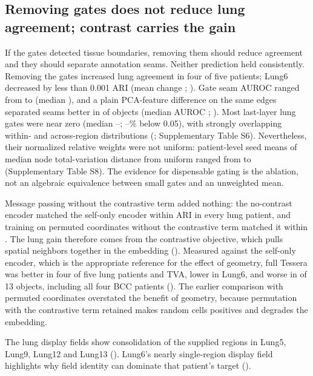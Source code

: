 \subsection{Removing gates does not reduce lung agreement; contrast carries the gain}
If the gates detected tissue boundaries, removing them should reduce agreement and they should separate annotation seams. Neither prediction held consistently. Removing the gates increased lung agreement in four of five patients; Lung6 decreased by less than 0.001 ARI (mean change \NoGateMean{}; ). Gate seam AUROC ranged from \GateAurocMin{} to \GateAurocMax{} (median \GateAurocMedian{}), and a plain PCA-feature difference on the same edges separated seams better in \GateBeaten{} of \GateObjects{} objects (median AUROC \GateExprAurocMedian{}; ). Most last-layer lung gates were near zero (median \LungGateMedianMin{}--\LungGateMedianMax{}; \LungGateLowMin{}--\LungGateLowMax{}\% below 0.05), with strongly overlapping within- and across-region distributions (; Supplementary Table S6). Nevertheless, their normalized relative weights were not uniform: patient-level seed means of median node total-variation distance from uniform ranged from \LungWeightTvdMin{} to \LungWeightTvdMax{} (Supplementary Table S8). The evidence for dispensable gating is the ablation, not an algebraic equivalence between small gates and an unweighted mean.

Message passing without the contrastive term added nothing: the no-contrast encoder matched the self-only encoder within \NoContrastSelfMaxGap{} ARI in every lung patient, and training on permuted coordinates without the contrastive term matched it within \PermNoContrastMaxGap{}. The lung gain therefore comes from the contrastive objective, which pulls spatial neighbors together in the embedding (). Measured against the self-only encoder, which is the appropriate reference for the effect of geometry, full Tessera was better in four of five lung patients and TVA, lower in Lung6, and worse in \BelowSelfOnly{} of 13 objects, including all four BCC patients (). The earlier comparison with permuted coordinates overstated the benefit of geometry, because permutation with the contrastive term retained makes random cells positives and degrades the embedding.



The lung display fields show consolidation of the supplied regions in Lung5, Lung9, Lung12 and Lung13 (). Lung6's nearly single-region display field highlights why field identity can dominate that patient's target ().



